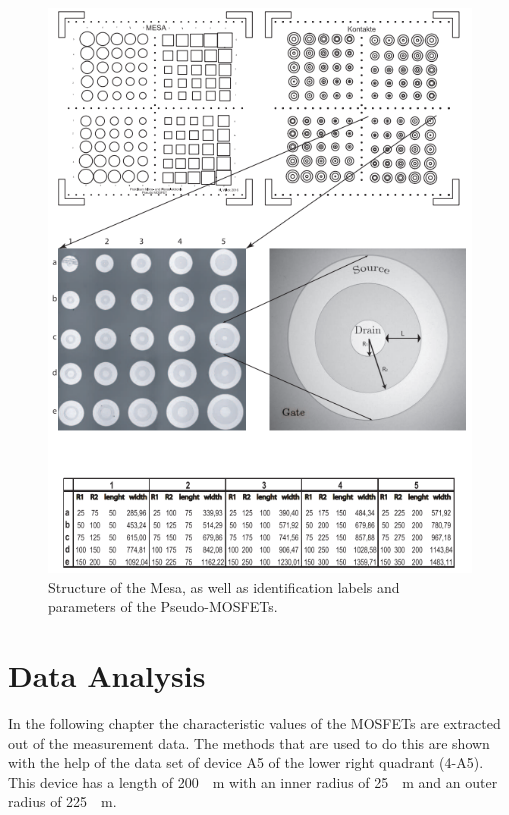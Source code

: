 \documentclass[%
 reprint,
amsmath,amssymb,
pra,
]{revtex4-1}
\begin{document}
\begin{figure}
\centering
\includegraphics[scale=0.6]{Bilder/Screenshot_1.png}
\caption{Structure of the Mesa, as well as identification labels and parameters of the Pseudo-MOSFETs.\cite{Anleitung}}
\label{fig:bezeichnung}
\end{figure}

\section{Data Analysis}
In the following chapter the characteristic values of the MOSFETs are extracted out of the measurement data. The methods that are used to do this are shown with the help of the data set of device A5 of the lower right quadrant (4-A5). This device has a length of \SI{200}{\mu m} with an inner radius of \SI{25}{\mu m} and an outer radius of \SI{225}{\mu m}.
\end{document}
